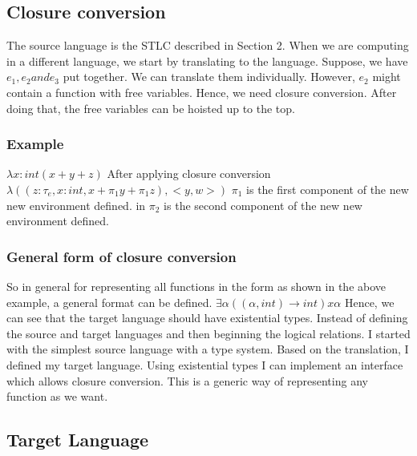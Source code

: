 \documentclass[10pt]{article}
\begin{document}
\subsection{Closure conversion}
The source language is the STLC described in Section 2. When we are computing in a different language, we start by translating to the language. Suppose, we have $e_1, e_2 and e_3$ put together. We can translate them individually. However, $e_2$ might contain a function with free variables. Hence, we need closure conversion. After doing that, the free variables can be hoisted up to the top.

\vskip 0.1in

\subsubsection{Example}

$\lambda x:  int ( x + y + z)$
\vskip 0.2in
After applying closure conversion
\vskip 0.1in
$\lambda (( z: \tau_e, x:int, x + \pi_1y + \pi_1z) , < y,w>)$
\vskip 0.2in
$\pi_1$ is the first component of the new new environment defined.
 in
$\pi_2$ is the second component of the new new environment defined.

\subsubsection{General form of closure conversion}

So in general for representing all functions in the form as shown in the above example, a general format can be defined. 
\vskip 0.2in
$ \exists \alpha ((\alpha, int) \rightarrow int)x \alpha$
\vskip 0.1in
Hence, we can see that the target language should have existential types. Instead of defining the source and target languages and then beginning the logical relations. I started with the simplest source language with a type system. Based on the translation, I defined my target language. Using existential types I can implement an interface which allows closure conversion. This is a generic way of representing any function as we want. 


\subsection{Target Language}
\end{document}
